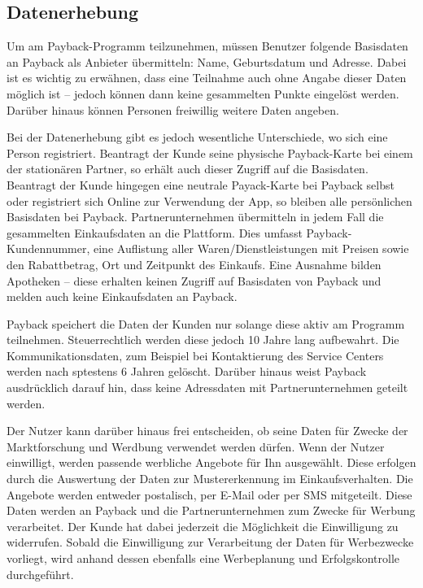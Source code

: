 \subsection{Datenerhebung}
Um am Payback-Programm teilzunehmen, müssen Benutzer folgende Basisdaten an Payback als Anbieter übermitteln: Name, Geburtsdatum und Adresse. Dabei ist es wichtig zu erwähnen, dass eine Teilnahme auch ohne Angabe dieser Daten möglich ist -- jedoch können dann keine gesammelten Punkte eingelöst werden. \cite{Payback_Teilnahme} Darüber hinaus können Personen freiwillig weitere Daten angeben. \cite{Payback_Datenschutz} \newline

\noindent Bei der Datenerhebung gibt es jedoch wesentliche Unterschiede, wo sich eine Person registriert. Beantragt der Kunde seine physische Payback-Karte bei einem der stationären Partner, so erhält auch dieser Zugriff auf die Basisdaten. Beantragt der Kunde hingegen eine neutrale Payack-Karte bei Payback selbst oder registriert sich Online zur Verwendung der App, so bleiben alle persönlichen Basisdaten bei Payback. Partnerunternehmen übermitteln in jedem Fall die gesammelten Einkaufsdaten an die Plattform. Dies umfasst Payback-Kundennummer, eine Auflistung aller Waren/Dienstleistungen mit Preisen sowie den Rabattbetrag, Ort und Zeitpunkt des Einkaufs. Eine Ausnahme bilden Apotheken -- diese erhalten keinen Zugriff auf Basisdaten von Payback und melden auch keine Einkaufsdaten an Payback. \cite{Payback_Datenschutz} \newline

\noindent Payback speichert die Daten der Kunden nur solange diese aktiv am Programm teilnehmen. Steuerrechtlich werden diese jedoch 10 Jahre lang aufbewahrt. Die Kommunikationsdaten, zum Beispiel bei Kontaktierung des Service Centers werden nach sptestens 6 Jahren gelöscht. Darüber hinaus weist Payback ausdrücklich darauf hin, dass keine Adressdaten mit Partnerunternehmen geteilt werden. \cite{Payback_Datenschutz} \newline

\noindent Der Nutzer kann darüber hinaus frei entscheiden, ob seine Daten für Zwecke der Marktforschung und Werdbung verwendet werden dürfen. Wenn der Nutzer einwilligt, werden passende werbliche Angebote für Ihn ausgewählt. Diese erfolgen durch die Auswertung der Daten zur Mustererkennung im Einkaufsverhalten. Die Angebote werden entweder postalisch, per E-Mail oder per SMS mitgeteilt. Diese Daten werden an Payback und die Partnerunternehmen zum Zwecke für Werbung verarbeitet. Der Kunde hat dabei jederzeit die Möglichkeit die Einwilligung zu widerrufen. Sobald die Einwilligung zur Verarbeitung der Daten für Werbezwecke vorliegt, wird anhand dessen ebenfalls eine Werbeplanung und Erfolgskontrolle durchgeführt. \cite{Payback_Datenschutz} \newline

